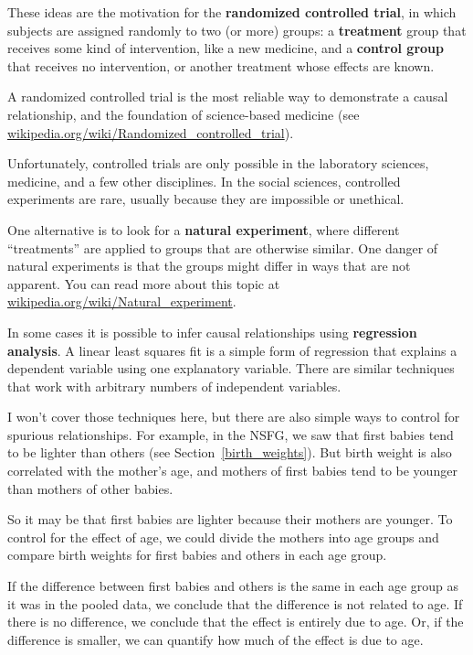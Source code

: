 \documentclass[12pt]{book}
\begin{document}
These ideas are the motivation for the {\bf randomized controlled
trial}, in which subjects are assigned randomly to two (or more)
groups: a {\bf treatment} group that receives some kind of intervention,
like a new medicine, and a {\bf control group} that receives
no intervention, or another treatment whose effects are known.

A randomized controlled trial is the most reliable way to demonstrate
a causal relationship, and the foundation of science-based medicine
(see \url{wikipedia.org/wiki/Randomized_controlled_trial}).

Unfortunately, controlled trials are only possible in the laboratory
sciences, medicine, and a few other disciplines.  In the social sciences,
controlled experiments are rare, usually because they are impossible
or unethical.

One alternative is to look for a {\bf natural experiment}, where
different ``treatments'' are applied to groups that are otherwise
similar.  One danger of natural experiments is that the groups might
differ in ways that are not apparent.  You can read more about this
topic at \url{wikipedia.org/wiki/Natural_experiment}.

In some cases it is possible to infer causal relationships using {\bf
  regression analysis}.  A linear least squares fit
is a simple form of regression that explains a dependent
variable using one explanatory variable.  There are similar
techniques that work with arbitrary numbers of independent variables.

I won't cover those techniques here, but there are also simple ways to
control for spurious relationships.  For example, in the NSFG, we saw
that first babies tend to be lighter than others (see
Section~\ref{birth_weights}).  But birth weight is also correlated
with the mother's age, and mothers of first babies tend to be younger
than mothers of other babies.

So it may be that first babies are lighter because their mothers are
younger.  To control for the effect of age, we could divide the mothers
into age groups and compare birth weights for first babies and others
in each age group.

If the difference between first babies and others is the same in
each age group as it was in the pooled data, we conclude
that the difference is not related to age.  If there is no difference,
we conclude that the effect is entirely due to age.  Or,
if the difference is smaller, we can quantify how much of the effect
is due to age.
\end{document}
